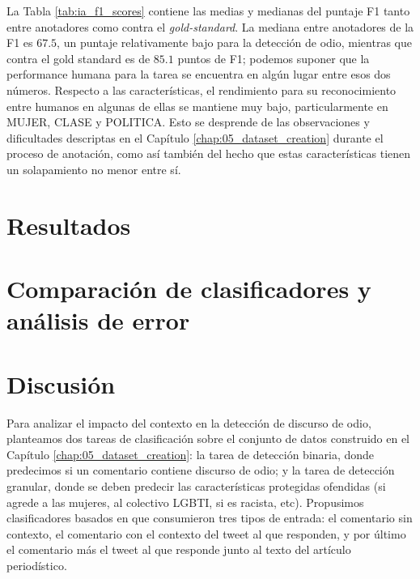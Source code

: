 La Tabla \ref{tab:ia_f1_scores} contiene las medias y medianas del puntaje F1 tanto entre anotadores como contra el \emph{gold-standard}. La mediana entre anotadores de la F1 es $67.5$, un puntaje relativamente bajo para la detección de odio, mientras que contra el gold standard es de $85.1$ puntos de F1; podemos suponer que la performance humana para la tarea se encuentra en algún lugar entre esos dos números. Respecto a las características, el rendimiento para su reconocimiento entre humanos en algunas de ellas se mantiene muy bajo, particularmente en MUJER, CLASE y POLITICA. Esto se desprende de las observaciones y dificultades descriptas en el Capítulo \ref{chap:05_dataset_creation} durante el proceso de anotación, como así también del hecho que estas características tienen un solapamiento no menor entre sí.



\section{Resultados}



\section{Comparación de clasificadores y análisis de error}





\section{Discusión}

Para analizar el impacto del contexto en la detección de discurso de odio, planteamos dos tareas de clasificación sobre el conjunto de datos construido en el Capítulo \ref{chap:05_dataset_creation}: la tarea de detección binaria, donde predecimos si un comentario contiene discurso de odio; y la tarea de detección granular, donde se deben predecir las características protegidas ofendidas (si agrede a las mujeres, al colectivo LGBTI, si es racista, etc). Propusimos clasificadores basados en \beto{} que consumieron tres tipos de entrada: el comentario sin contexto, el comentario con el contexto del tweet al que responden, y por último el comentario más el tweet al que responde junto al texto del artículo periodístico.


